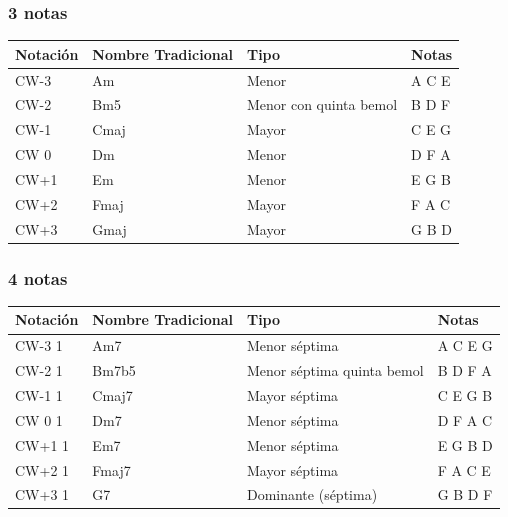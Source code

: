 \documentclass[]{report}
\begin{document}
\subsubsection*{3 notas}

\begin{table}[H]
	\centering
	\begin{tabularx}{\textwidth}{ll>{\raggedright\arraybackslash}Xl}
		\toprule
		Notación      & Nombre Tradicional & Tipo                   & Notas \\
		\midrule
		\textsf{CW-3} & Am                 & Menor                  & A C E \\
		\textsf{CW-2} & Bm5                & Menor con quinta bemol & B D F \\
		\textsf{CW-1} & Cmaj               & Mayor                  & C E G \\
		\textsf{CW 0} & Dm                 & Menor                  & D F A \\
		\textsf{CW+1} & Em                 & Menor                  & E G B \\
		\textsf{CW+2} & Fmaj               & Mayor                  & F A C \\
		\textsf{CW+3} & Gmaj               & Mayor                  & G B D \\
		\bottomrule
	\end{tabularx}
\end{table}
\subsubsection*{4 notas}

\begin{table}[H]
	\centering
	\begin{tabularx}{\textwidth}{ll>{\raggedright\arraybackslash}Xl}
		\toprule
		Notación        & Nombre Tradicional & Tipo                       & Notas   \\
		\midrule
		\textsf{CW-3} 1 & Am7                & Menor séptima              & A C E G \\
		\textsf{CW-2} 1 & Bm7b5              & Menor séptima quinta bemol & B D F A \\
		\textsf{CW-1} 1 & Cmaj7              & Mayor séptima              & C E G B \\
		\textsf{CW 0} 1 & Dm7                & Menor séptima              & D F A C \\
		\textsf{CW+1} 1 & Em7                & Menor séptima              & E G B D \\
		\textsf{CW+2} 1 & Fmaj7              & Mayor séptima              & F A C E \\
		\textsf{CW+3} 1 & G7                 & Dominante (séptima)        & G B D F \\
		\bottomrule
	\end{tabularx}
\end{table}
\end{document}
